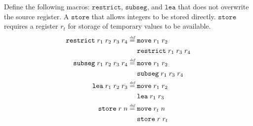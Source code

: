 \documentclass[a4paper]{article}
\newcommand{\defeq}{\stackrel{\textit{\tiny{def}}}{=}}
\newcommand{\zinstr}[1]{\mathtt{#1}}
\newcommand{\twoinstr}[3]{\zinstr{#1} \; #2 \; #3}
\newcommand{\move}[2]{\twoinstr{move}{#1}{#2}}
\newcommand{\store}[2]{\twoinstr{store}{#1}{#2}}
\newcommand{\lea}[2]{\twoinstr{lea}{#1}{#2}}
\newcommand{\threeinstr}[4]{\zinstr{#1} \; #2 \; #3 \; #4}
\newcommand{\restrict}[3]{\threeinstr{restrict}{#1}{#2}{#3}}
\newcommand{\subseg}[3]{\threeinstr{subseg}{#1}{#2}{#3}}
\begin{document}
\begin{comment}
After adding local capabilities, most of the definitions have changed slightly to take into account the new form the capabilities take. The only two instructions that have undergone enough change to deserve to be mentioned are $\mathtt{store}$ and $\mathtt{restrict}$. 

$\mathtt{store}$ has the same conditions as before, but if what we try to write is a local capability, then it needs to be a write access that permits write local.

$\mathtt{restrict}$ looks like before, but now it uses a ``permission pair'' which is the access permission and the locality. Whether a $\mathtt{restrict}$ succeeds depends on the ordering, so the real change lies in the new ordering, which is described further above (it is the point-wise ordering of the pair).
\end{comment}
Define the following macros: $\mathtt{restrict}$, $\mathtt{subseg}$, and $\mathtt{lea}$ that does not overwrite the source register. A $\mathtt{store}$ that allows integers to be stored directly. $\mathtt{store}$ requires a register $r_t$ for storage of temporary values to be available.
\begin{align*}
  \restrict{r_1}{r_2}{r_3} \; r_4 &\defeq
                                    \begin{aligned}[t]
                                      & \move{r_1}{r_2} \\
                                      & \restrict{r_1}{r_3}{r_4}
                                    \end{aligned} \\
  \subseg{r_1}{r_2}{r_3} \; r_4   &\defeq
                                    \begin{aligned}[t]
                                      & \move{r_1}{r_2} \\
                                      & \subseg{r_1}{r_3}{r_4}
                                    \end{aligned}\\
  \lea{r_1}{r_2} \; r_3           &\defeq
                                    \begin{aligned}[t]
                                      & \move{r_1}{r_2} \\
                                      & \lea{r_1}{r_3}
                                    \end{aligned}\\
  \store{r}{n} &\defeq
                 \begin{aligned}[t]
                   & \move{r_t}{n} \\
                   & \store{r}{r_t}
                 \end{aligned}
\end{align*}
\end{document}
